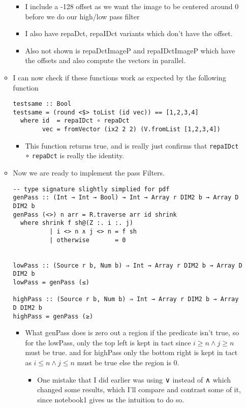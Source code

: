 \documentclass{article}
\begin{document}
\begin{enumerate}
\begin{itemize}
\begin{itemize}
\item I include a -128 offset as we want the image to be centered around
0 before we do our high/low pass filter

\item Ι also have repaDct, repaIDct variants which don't have the offset.

\item Also not shown is repaDctImageP and repaIDctImageP which have the
offsets and also compute the vectors in parallel.
\end{itemize}

\item Ι can now check if these functions work as expected by the following
function
\begin{verbatim}
testsame :: Bool
testsame = (round <$> toList (id vec)) == [1,2,3,4]
  where id  = repaIDct ∘ repaDct
        vec = fromVector (ix2 2 2) (V.fromList [1,2,3,4])
\end{verbatim}
\begin{itemize}
\item This function returns true, and is really just confirms that
\texttt{repaIDct} ∘ \texttt{repaDct} is really the identity.
\end{itemize}

\item Now we are ready to implement the pass Filters.
\begin{verbatim}
-- type signature slightly simplied for pdf
genPass :: (Int → Int → Bool) → Int → Array r DIM2 b → Array D DIM2 b
genPass (<>) n arr = R.traverse arr id shrink
  where shrink f sh@(Z :. i :. j)
          | i <> n ∧ j <> n = f sh
          | otherwise       = 0


lowPass :: (Source r b, Num b) ⇒ Int → Array r DIM2 b → Array D DIM2 b
lowPass = genPass (≤)

highPass :: (Source r b, Num b) ⇒ Int → Array r DIM2 b → Array D DIM2 b
highPass = genPass (≥)
\end{verbatim}
\begin{itemize}
\item What genPass does is zero out a region if the predicate isn't
true, so for the lowPass, only the top left is kept in tact since
$i ≥ n ∧ j ≥ n$ must be true. and for highPass only the bottom
right is kept in tact as $i ≤ n ∧ j ≤ n$ must be true else the
region is 0.

\begin{itemize}
\item One mistake that Ι did earlier was using ∨ instead of ∧ which
changed some results, which I'll compare and contrast some of it,
since notebook1 gives us the intuition to do so.
\end{itemize}


\end{itemize}
\end{itemize}
\end{enumerate}
\end{document}
